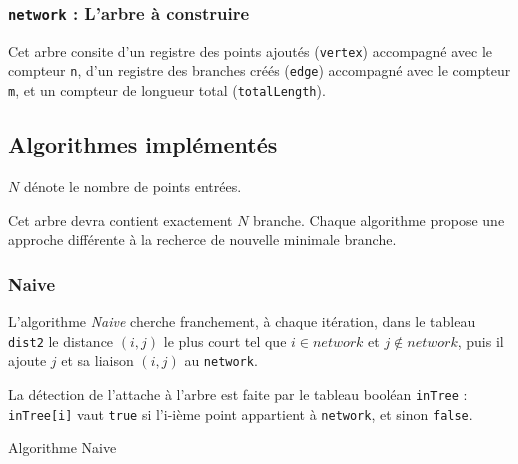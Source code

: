 \documentclass[10pt,a4paper]{article}
\begin{document}
\subsubsection{\texttt{network} : L'arbre à construire}

Cet arbre consite d'un registre des points ajoutés (\texttt{vertex}) accompagné avec le compteur \texttt{n}, d'un registre des branches créés (\texttt{edge}) accompagné avec le compteur \texttt{m}, et un compteur de longueur total (\texttt{totalLength}).

\subsection{Algorithmes implémentés}

$N$ dénote le nombre de points entrées.

Cet arbre devra contient exactement $N$ branche. Chaque algorithme propose une approche différente à la recherce de nouvelle minimale branche.

\subsubsection{Naive}

L'algorithme \emph{Naive} cherche franchement, à chaque itération, dans le tableau \texttt{dist2} le distance $(i,j)$ le plus court tel que $i \in network$ et $j \not \in network$, puis il ajoute $j$ et sa liaison $(i,j)$ au \texttt{network}.

La détection de l'attache à l'arbre est faite par le tableau booléan \texttt{inTree} : \texttt{inTree[i]} vaut \texttt{true} si l'i-ième point appartient à \texttt{network}, et sinon \texttt{false}.

\begin{algorithm}[H]
    \caption{Algorithme Naive}
\end{algorithm}
\end{document}
